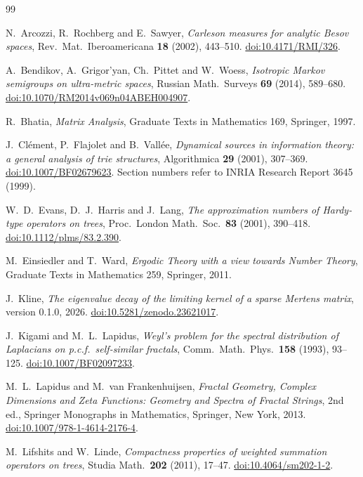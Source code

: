 \documentclass[11pt]{article}
\theoremstyle{definition}
\theoremstyle{remark}
\begin{document}
\begin{thebibliography}{99}
\raggedright
{}
N.~Arcozzi, R.~Rochberg and E.~Sawyer,
\emph{Carleson measures for analytic Besov spaces},
Rev.\ Mat.\ Iberoamericana \textbf{18} (2002), 443--510.
\href{https://doi.org/10.4171/RMI/326}{doi:10.4171/RMI/326}.

A.~Bendikov, A.~Grigor'yan, Ch.~Pittet and W.~Woess,
\emph{Isotropic Markov semigroups on ultra-metric spaces},
Russian Math.\ Surveys \textbf{69} (2014), 589--680.
\href{https://doi.org/10.1070/RM2014v069n04ABEH004907}{doi:10.1070/RM2014v069n04ABEH004907}.

R.~Bhatia, \emph{Matrix Analysis}, Graduate Texts in Mathematics 169,
Springer, 1997.

J.~Cl\'ement, P.~Flajolet and B.~Vall\'ee,
\emph{Dynamical sources in information theory: a general analysis of
trie structures}, Algorithmica \textbf{29} (2001), 307--369.
\href{https://doi.org/10.1007/BF02679623}{doi:10.1007/BF02679623}.
Section numbers refer to INRIA Research Report 3645 (1999).

W.~D.~Evans, D.~J.~Harris and J.~Lang,
\emph{The approximation numbers of Hardy-type operators on trees},
Proc.\ London Math.\ Soc.\ \textbf{83} (2001), 390--418.
\href{https://doi.org/10.1112/plms/83.2.390}{doi:10.1112/plms/83.2.390}.

M.~Einsiedler and T.~Ward, \emph{Ergodic Theory with a view towards
Number Theory}, Graduate Texts in Mathematics 259, Springer, 2011.

J.~Kline,
\emph{The eigenvalue decay of the limiting kernel of a sparse Mertens matrix},
version 0.1.0, 2026.
\href{https://doi.org/10.5281/zenodo.23621017}{doi:10.5281/zenodo.23621017}.

J.~Kigami and M.~L.~Lapidus,
\emph{Weyl's problem for the spectral distribution of Laplacians on
p.c.f.\ self-similar fractals},
Comm.\ Math.\ Phys.\ \textbf{158} (1993), 93--125.
\href{https://doi.org/10.1007/BF02097233}{doi:10.1007/BF02097233}.

M.~L.~Lapidus and M.~van Frankenhuijsen,
\emph{Fractal Geometry, Complex Dimensions and Zeta Functions: Geometry
and Spectra of Fractal Strings}, 2nd ed., Springer Monographs in
Mathematics, Springer, New York, 2013.
\href{https://doi.org/10.1007/978-1-4614-2176-4}{doi:10.1007/978-1-4614-2176-4}.

M.~Lifshits and W.~Linde,
\emph{Compactness properties of weighted summation operators on trees},
Studia Math.\ \textbf{202} (2011), 17--47.
\href{https://doi.org/10.4064/sm202-1-2}{doi:10.4064/sm202-1-2}.


\end{thebibliography}
\end{document}
